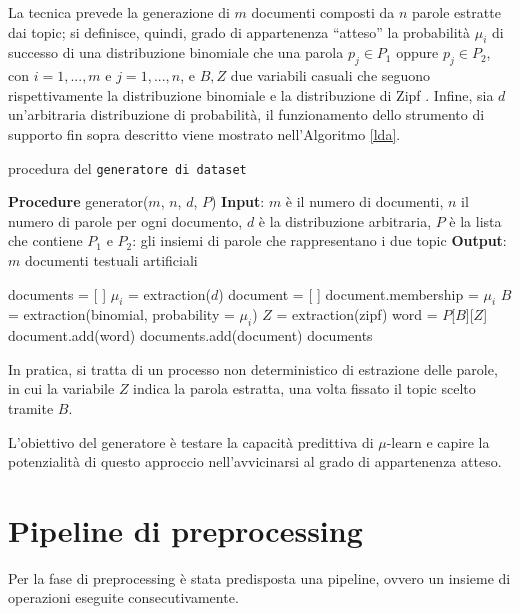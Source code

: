\documentclass[12pt]{report}
\theoremstyle{definition}
\begin{document}
La tecnica prevede la generazione di $m$ documenti composti da $n$ parole estratte dai topic; si definisce, quindi, grado di appartenenza ``atteso'' la probabilità $\mu_i$ di successo di una distribuzione binomiale che una parola $p_j \in P_1$ oppure $p_j \in P_2$, con $i=1, ..., m$ e $j=1, ..., n$, e $B, Z$ due variabili casuali che seguono rispettivamente la distribuzione binomiale e la distribuzione di Zipf \cite{34}. Infine, sia $d$ un'arbitraria distribuzione di probabilità, il funzionamento dello strumento di supporto fin sopra descritto viene mostrato nell'Algoritmo \ref{lda}.
\begin{algorithm}
\caption{procedura del \texttt{generatore di dataset}}
\label{lda}
\hspace*{\algorithmicindent} \textbf{Procedure} generator($m$, $n$, $d$, $P$)
\newline
\hspace*{\algorithmicindent} \textbf{Input}: $m$ è il numero di documenti, $n$ il numero di parole per ogni documento, $d$ è la distribuzione arbitraria, $P$ è la lista che contiene $P_1$ e $P_2$: gli insiemi di parole che rappresentano i due topic
\newline
\hspace*{\algorithmicindent} \textbf{Output}: $m$ documenti testuali artificiali
\begin{algorithmic}[1]
\STATE documents = [ ]
\STATE $\mu_i$ = extraction($d$)
\STATE document = [ ]
\STATE document.membership = $\mu_i$
\STATE $B$ = extraction(binomial, probability = $\mu_i$)
\STATE $Z$ = extraction(zipf)
\STATE word = $P$[$B$][$Z$]
\STATE document.add(word)
\ENDFOR
\STATE documents.add(document)
\ENDFOR
\RETURN documents
\end{algorithmic}
\end{algorithm}
In pratica, si tratta di un processo non deterministico di estrazione delle parole, in cui la variabile $Z$ indica la parola estratta, una volta fissato il topic scelto tramite $B$.

L'obiettivo del generatore è testare la capacità predittiva di $\mu$-learn e capire la potenzialità di questo approccio nell'avvicinarsi al grado di appartenenza atteso.

\section{Pipeline di preprocessing}\label{pp}
Per la fase di preprocessing è stata predisposta una pipeline, ovvero un insieme di operazioni eseguite consecutivamente.
\end{document}
